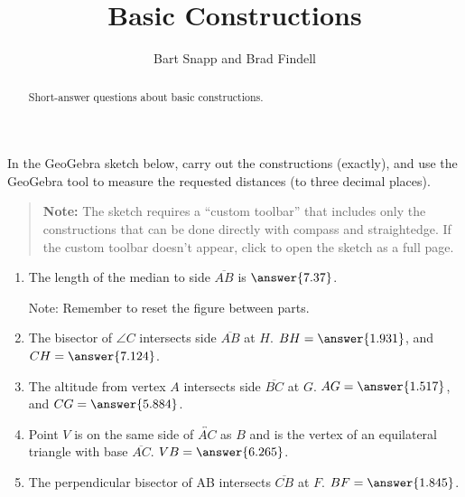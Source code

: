 \documentclass[nooutcomes]{ximera}
\title{Basic Constructions}
\author{Bart Snapp and Brad Findell}
\begin{document}
\begin{abstract}
Short-answer questions about basic constructions. 
\end{abstract}
\maketitle

\begin{problem}
In the GeoGebra sketch below, carry out the constructions (exactly), and use the GeoGebra tool to measure the requested distances (to three decimal places).  
\begin{quote}
\textbf{Note:} The sketch requires a ``custom toolbar'' that includes only the constructions that can be done directly with compass and straightedge.  If the custom toolbar doesn't appear, click 
 to open the sketch as a full page.  
\end{quote}
\begin{center}  
\end{center}
\begin{enumerate}
\item The length of the median to side $\overline{AB}$ 
is $\answer{7.37}$.  

Note: Remember to reset the figure between parts.   

\item The bisector of $\angle C$ intersects side $\overline{AB}$ at $H$.  
$BH =  \answer{1.931}$, and $CH = \answer{7.124}$.  

\item The altitude from vertex $A$ intersects side $\overline{BC}$ at $G$.
$AG = \answer{1.517}$, and 
$CG = \answer{5.884}$.  

\item Point $V$ is on the same side of $\overleftrightarrow{AC}$ as $B$ and is the vertex of an equilateral triangle with base $\overline{AC}$.  
$VB = \answer{6.265}$. 

\item The perpendicular bisector of AB intersects $\overline{CB}$ at $F$.  
$BF = \answer{1.845}$.
\end{enumerate}

\end{problem}
\end{document}
